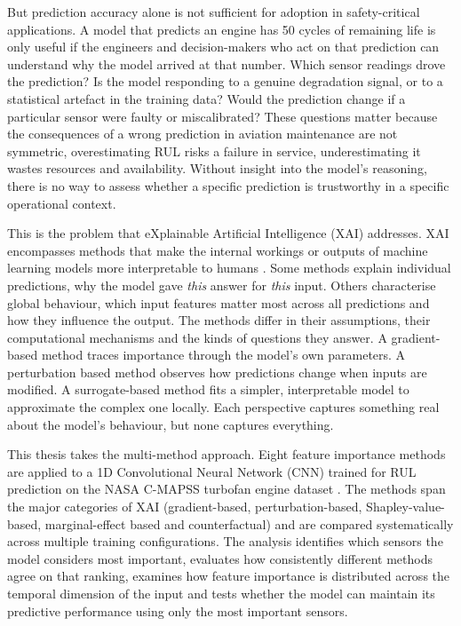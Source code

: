 But prediction accuracy alone is not sufficient for adoption in safety-critical applications. A model that predicts an engine has 50 cycles of remaining life is only useful if the engineers and decision-makers who act on that prediction can understand why the model arrived at that number. Which sensor readings drove the prediction? Is the model responding to a genuine degradation signal, or to a statistical artefact in the training data? Would the prediction change if a particular sensor were faulty or miscalibrated? These questions matter because the consequences of a wrong prediction in aviation maintenance are not symmetric, overestimating RUL risks a failure in service, underestimating it wastes resources and availability. Without insight into the model's reasoning, there is no way to assess whether a specific prediction is trustworthy in a specific operational context.

This is the problem that eXplainable Artificial Intelligence (XAI) addresses. XAI encompasses methods that make the internal workings or outputs of machine learning models more interpretable to humans \citep{BarredoArrieta2020}. Some methods explain individual predictions, why the model gave \textit{this} answer for \textit{this} input. Others characterise global behaviour, which input features matter most across all predictions and how they influence the output. The methods differ in their assumptions, their computational mechanisms and the kinds of questions they answer. A gradient-based method traces importance through the model's own parameters. A perturbation based method observes how predictions change when inputs are modified. A surrogate-based method fits a simpler, interpretable model to approximate the complex one locally. Each perspective captures something real about the model's behaviour, but none captures everything.

This thesis takes the multi-method approach. Eight feature importance methods are applied to a 1D Convolutional Neural Network (CNN) trained for RUL prediction on the NASA C-MAPSS turbofan engine dataset \citep{Saxena2008}. The methods span the major categories of XAI (gradient-based, perturbation-based, Shapley-value-based, marginal-effect based and counterfactual) and are compared systematically across multiple training configurations. The analysis identifies which sensors the model considers most important, evaluates how consistently different methods agree on that ranking, examines how feature importance is distributed across the temporal dimension of  the input and tests whether the model can maintain its predictive performance using only the most important sensors.

